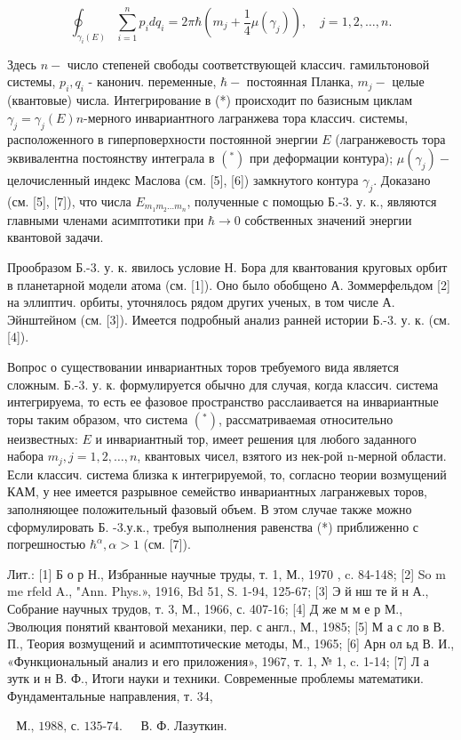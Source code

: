 \documentclass[10pt]{article}
\begin{document}
\[

\oint_{\gamma_{i}(E)} \sum_{i=1}^{n} p_{i} d q_{i}=2 \pi \hbar\left(m_{j}+\frac{1}{4} \mu\left(\gamma_{j}\right)\right), \quad j=1,2, \ldots, n .

\]



Здесь $n-$ число степеней свободы соответствующей классич. гамильтоновой системы, $p_{i}, q_{i}$ - канонич. переменные, $\hbar-$ постоянная Планка, $m_{j}-$ целые (квантовые) числа. Интегрирование в (*) происходит по базисным циклам $\gamma_{j}=\gamma_{j}(E) n$-мерного инвариантного лагранжева тора классич. системы, расположенного в гиперповерхности постоянной энергии $E$ (лагранжевость тора эквивалентна постоянству интеграла в $\left(^{*}\right)$ при деформации контура); $\mu\left(\gamma_{j}\right)-$ целочисленный индекс Маслова (см. [5], [6]) замкнутого контура $\gamma_{j}$. Доказано (см. [5], [7]), что числа $E_{m_{1} m_{2} \ldots m_{n}}$, полученные с помощью Б.-3. у. к., являются главными членами асимптотики при $\hbar \rightarrow 0$ собственных значений энергии квантовой задачи.



Прообразом Б.-3. у. к. явилось условие Н. Бора для квантования круговых орбит в планетарной модели атома (см. [1]). Оно было обобщено А. Зоммерфельдом [2] на эллиптич. орбиты, уточнялось рядом других ученых, в том числе А. Эйнштейном (см. [3]). Имеется подробный анализ ранней истории Б.-3. у. к. (см. [4]).



Вопрос о существовании инвариантных торов требуемого вида является сложным. Б.-3. у. к. формулируется обычно для случая, когда классич. система интегрируема, то есть ее фазовое пространство расслаивается на инвариантные торы таким образом, что система $\left({ }^{*}\right)$, рассматриваемая относительно неизвестных: $E$ и инвариантный тор, имеет решения цля любого заданного набора $m_{j}, j=1,2, \ldots, n$, квантовых чисел, взятого из нек-рой n-мерной области. Если классич. система близка к интегрируемой, то, согласно теории возмущений КАМ, у нее имеется разрывное семейство инвариантных лагранжевых торов, заполняющее положительный фазовый объем. В этом случае также можно сформулировать Б. -3.у.к., требуя выполнения равенства (*) приближенно с погрешностью $\hbar^{\alpha}, \alpha>1$ (см. [7]).



Лит.: [1] Б о р Н., Избранные научные труды, т. 1, М., 1970 , c. 84-148; [2] So m me rfeld A., "Ann. Phys.», 1916, Bd 51, S. 1-94, 125-67; [3] Э й нш те й н А., Собрание научных трудов, т. 3, М., 1966, с. 407-16; [4] Д же м м е р М., Эволюция понятий квантовой механики, пер. с англ., М., 1985; [5] М а с ло в В. П., Теория возмущений и асимптотические методы, М., 1965; [6] Арн ол ьд В. И., «Функциональный анализ и его приложения», 1967, т. 1, № 1, c. 1-14; [7] Л а зутк и н В. Ф., Итоги науки и техники. Современные проблемы математики. Фундаментальные направления, т. 34,



$\begin{array}{ll}\text { М., 1988, с. 135-74. } & \text { В. Ф. Лазуткин. }\end{array}$
\end{document}
